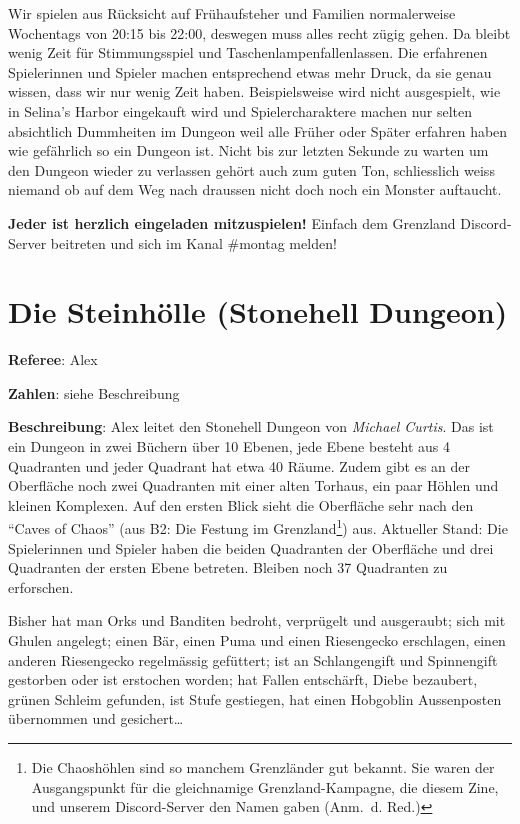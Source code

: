 \documentclass[11pt]{wbzine}
\begin{document}
\begin{multicols}{2}
Wir spielen aus Rücksicht auf Frühaufsteher und Familien normalerweise
Wochentags von 20:15 bis 22:00, deswegen muss alles recht zügig gehen. Da
bleibt wenig Zeit für Stimmungsspiel und Taschenlampenfallenlassen. Die
erfahrenen Spielerinnen und Spieler machen entsprechend etwas mehr Druck, da
sie genau wissen, dass wir nur wenig Zeit haben. Beispielsweise wird nicht
ausgespielt, wie in Selina's Harbor eingekauft wird und Spielercharaktere
machen nur selten absichtlich Dummheiten im Dungeon weil alle Früher oder
Später erfahren haben wie gefährlich so ein Dungeon ist. Nicht bis zur letzten
Sekunde zu warten um den Dungeon wieder zu verlassen gehört auch zum guten Ton,
schliesslich weiss niemand ob auf dem Weg nach draussen nicht doch noch ein
Monster auftaucht.

\textbf{Jeder ist herzlich eingeladen mitzuspielen!} Einfach dem Grenzland
Discord-Server beitreten und sich im Kanal \#montag melden!


\section{Die Steinhölle (Stonehell Dungeon)}

\textbf{Referee}: Alex

\textbf{Zahlen}: siehe Beschreibung

    \textbf{Beschreibung}: Alex leitet den Stonehell Dungeon von
    \textit{Michael Curtis}. Das ist ein Dungeon in zwei Büchern
    über 10 Ebenen, jede Ebene besteht aus 4 Quadranten und jeder
    Quadrant hat etwa 40 Räume. Zudem gibt es an der Oberfläche noch
    zwei Quadranten mit einer alten Torhaus, ein paar Höhlen und
    kleinen Komplexen. Auf den ersten Blick sieht die Oberfläche
    sehr nach den “Caves of Chaos” (aus B2: Die Festung im
    Grenzland\footnote{Die Chaoshöhlen sind so manchem Grenzländer
    gut bekannt. Sie waren der Ausgangspunkt für die gleichnamige
    Grenzland-Kampagne, die diesem Zine, und unserem Discord-Server
    den Namen gaben (Anm.\ d. Red.)}) aus. Aktueller Stand: Die
    Spielerinnen und Spieler haben die beiden Quadranten der
    Oberfläche und drei Quadranten der ersten Ebene betreten.
    Bleiben noch 37 Quadranten zu erforschen.

    Bisher hat man Orks und Banditen bedroht, verprügelt und
    ausgeraubt; sich mit Ghulen angelegt; einen Bär, einen Puma und
    einen Riesengecko erschlagen, einen anderen Riesengecko
    regelmässig gefüttert; ist an Schlangengift und Spinnengift
    gestorben oder ist erstochen worden; hat Fallen entschärft,
    Diebe bezaubert, grünen Schleim gefunden, ist Stufe gestiegen,
    hat einen Hobgoblin Aussenposten übernommen und gesichert…


\end{multicols}
\end{document}
